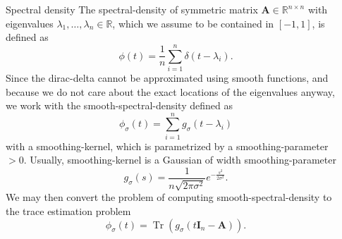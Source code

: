 \documentclass[final, leqno, 12pt]{beamer}
\newcommand{\mtx}[1]{\boldsymbol{#1}}
\DeclareMathOperator{\Tr}{Tr}
\begin{document}
\begin{frame}[t]
\begin{columns}[t]
\begin{column}{0.45\paperwidth}
        \begin{block}{Spectral density}
            The \gls{spectral-density} of symmetric matrix $\mtx{A} \in \mathbb{R}^{n \times n}$
            with eigenvalues $\lambda_1, \dots, \lambda_n \in \mathbb{R}$, which
            we assume to be contained in $[-1, 1]$,
            is defined as
            \begin{equation}
                \phi(t) = \frac{1}{n} \sum_{i=1}^n \delta(t - \lambda_i).
            \end{equation}
            Since the \gls{dirac-delta} cannot be approximated using smooth functions,
            and because we do not care about the exact locations of the eigenvalues anyway,
            we work with the \gls{smooth-spectral-density} defined as
            \begin{equation}
                \phi_{\sigma}(t) = \sum_{i=1}^n g_{\sigma}(t - \lambda_i)
            \end{equation}
            with a \gls{smoothing-kernel}, which is parametrized by a \gls{smoothing-parameter} $>0$.
            Usually, \gls{smoothing-kernel} is a Gaussian of width \gls{smoothing-parameter}
            \begin{equation}
                g_{\sigma}(s) = \frac{1}{n \sqrt{2 \pi \sigma^2}} e^{-\frac{s^2}{2\sigma^2}}.
            \end{equation}
            We may then convert the problem of computing \gls{smooth-spectral-density}
            to the trace estimation problem
            \begin{equation}
                \phi_{\sigma}(t) = \Tr(g_{\sigma}(t \mtx{I}_n - \mtx{A})).
            \end{equation}
        \end{block}

    \end{column}

    \begin{column}{0.45\paperwidth}


\end{column}
\end{columns}
\end{frame}
\end{document}

